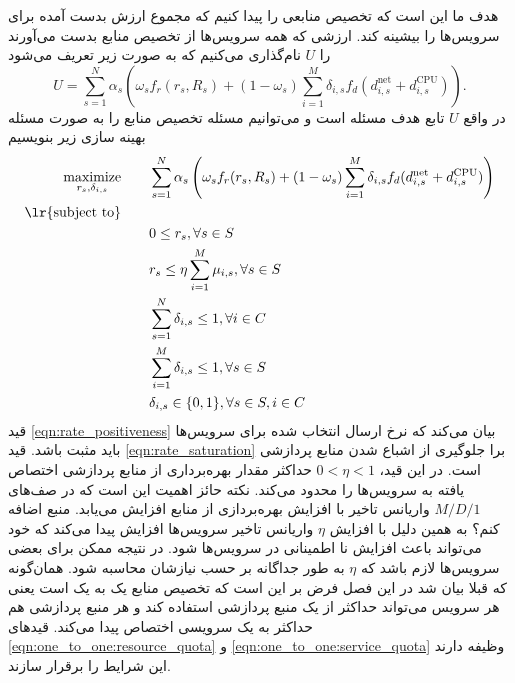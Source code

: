    هدف ما این است که تخصیص منابعی را پیدا کنیم که مجموع ارزش بدست آمده برای سرویس‌ها را بیشینه کند.
    ارزشی که همه سرویس‌ها از تخصیص منابع بدست می‌آورند را $U$ نام‌گذاری می‌کنیم که به صورت زیر تعریف می‌شود
    \begin{equation}
      U = \sum_{s=1}^N \alpha_s \left (\omega_s f_r(r_s, R_s) + (1-\omega_s) \sum_{i=1}^M \delta_{i,s} f_d(d_{i,s}^{\text{net}} + d_{i,s}^{\text{CPU}}) \right).
    \end{equation}
    در واقع $U$ تابع هدف مسئله است و می‌توانیم مسئله تخصیص منابع را به صورت مسئله بهینه سازی زیر بنویسیم
    \begin{subequations}
      \begin{align}
        \underset{r_s, \delta_{i,s}}{\text{maximize}} \qquad & \sum_{s=1}^N \alpha_s \left (\omega_s f_r(r_s, R_s) + (1-\omega_s) \sum_{i=1}^M \delta_{i,s} f_d(d_{i,s}^{\text{net}} + d_{i,s}^{\text{CPU}}) \right ) \\
        \text{\lr{subject  to}} \qquad & \nonumber \\
        & 0 \le r_s, \forall s \in S\label{eqn:rate_positiveness} \\
        & r_s \le \eta \sum_{i=1}^M \mu_{i,s}, \forall s \in S\label{eqn:rate_saturation}\\
        & \sum_{s=1}^N \delta_{i,s} \le 1, \forall i \in C \label{eqn:one_to_one:resource_quota}\\
        & \sum_{i=1}^M \delta_{i,s} \le 1, \forall s \in S \label{eqn:one_to_one:service_quota}\\
        & \delta_{i,s} \in \{0, 1\}, \forall s \in S, i \in C
      \end{align}
    \end{subequations}
    قید \eqref{eqn:rate_positiveness} بیان می‌کند که نرخ ارسال انتخاب شده برای سرویس‌ها باید مثبت باشد.
    قید \eqref{eqn:rate_saturation} برا جلوگیری از اشباع شدن منابع پردازشی است.
    در این قید، $0 < \eta < 1$ حداکثر مقدار بهره‌برداری از منابع پردازشی اختصاص یافته به سرویس‌ها را محدود می‌کند.
    نکته حائز اهمیت این است که در صف‌های $M/D/1$ واریانس تاخیر با افزایش بهره‌بردازی از منابع افزایش می‌یابد. {منبع اضافه کنم؟}
    به همین دلیل با افزایش $\eta$ واریانس تاخیر سرویس‌ها افزایش پیدا می‌کند که خود می‌تواند باعث افزایش نا اطمینانی در سرویس‌ها شود.
    در نتیجه ممکن برای بعضی سرویس‌ها لازم باشد که $\eta$ به طور جداگانه بر حسب نیازشان محاسبه شود.
    همان‌گونه که قبلا بیان شد در این فصل فرض بر این است که تخصیص منابع یک به یک است یعنی هر سرویس می‌تواند حداکثر از یک منبع پردازشی استفاده کند و هر منبع پردازشی هم حداکثر به یک سرویسی اختصاص پیدا می‌کند.
    قید‌های \eqref{eqn:one_to_one:resource_quota} و \eqref{eqn:one_to_one:service_quota} وظیفه دارند این شرایط را برقرار سازند.
        
